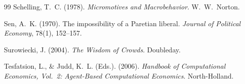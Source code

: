\documentclass[12pt]{article}
\begin{document}
\begin{thebibliography}{99}
Schelling, T.~C. (1978).
\newblock \emph{Micromotives and Macrobehavior}.
\newblock W.~W.\ Norton.

Sen, A.~K. (1970).
\newblock The impossibility of a Paretian liberal.
\newblock \emph{Journal of Political Economy}, 78(1), 152--157.

Surowiecki, J. (2004).
\newblock \emph{The Wisdom of Crowds}.
\newblock Doubleday.

Tesfatsion, L., \& Judd, K.~L. (Eds.). (2006).
\newblock \emph{Handbook of Computational Economics, Vol.~2: Agent-Based Computational Economics}.
\newblock North-Holland.

\end{thebibliography}
\end{document}
